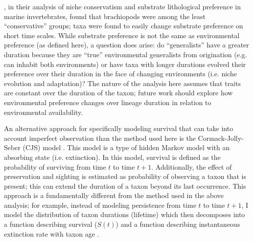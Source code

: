 \documentclass{article}
\begin{document}
\citet{Hopkins2014a}, in their analysis of niche conservatism and substrate lithological preference in marine invertebrates, found that brachiopods were among the least ``conservative'' groups; taxa were found to easily change substrate preference on short time scales. While substrate preference is not the same as environmental preference (as defined here), a question does arise: do ``generalists'' have a greater duration because they are ``true'' environmental generalists from origination (e.g. can inhabit both environments) or have taxa with longer durations evolved their preference over their duration in the face of changing environments (i.e. niche evolution and adaptation)? The nature of the analysis here assumes that traits are constant over the duration of the taxon; future work should explore how environmental preference changes over lineage duration in relation to environmental availability.




An alternative approach for specifically modeling survival that can take into account imperfect observation than the method used here is the Cormack-Jolly-Seber (CJS) model \citep{Royle2008,Liow2008,Tomiya2013,Liow2010b}. This model is a type of hidden Markov model with an absorbing state (i.e. extinction). In this model, survival is defined as the probability of surviving from time \(t\) to time \(t + 1\). Additionally, the effect of preservation and sighting is estimated as probability of observing a taxon that is present; this can extend the duration of a taxon beyond its last occurrence. This approach is a fundamentally different from the method used in the above analysis; for example, instead of modeling persistence from time \(t\) to time \(t + 1\), I model the distribution of taxon durations (lifetime) which then decomposes into a function describing survival (\(S(t)\)) and a function describing instantaneous extinction rate with taxon age \citep{Klein2003,Royle2008}. 
\end{document}
